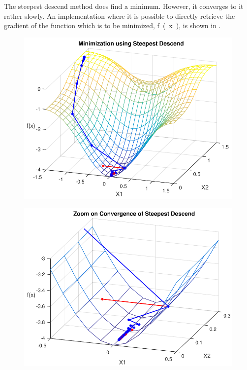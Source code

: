 The steepest descend method does find a minimum. However, it converges to it rather slowly. An implementation where it is possible to directly retrieve the gradient of the function which is to be minimized, \si{f(x)}, is shown in .

\begin{minipage}{\linewidth}
	\begin{minipage}{0.45\linewidth}
		\begin{figure}[H]
			\includegraphics[scale=.6]{figures/steepestDescendEx}
			\centering
			\captionsetup{justification=centering}
			\label{steepestDescendEx}
		\end{figure}
	\end{minipage}
	\hspace{0.03\linewidth}
	\begin{minipage}{0.45\linewidth}
		\begin{figure}[H]
			\includegraphics[scale=.6]{figures/steepestDesendExZoom}

\end{figure}
\end{minipage}
\end{minipage}

